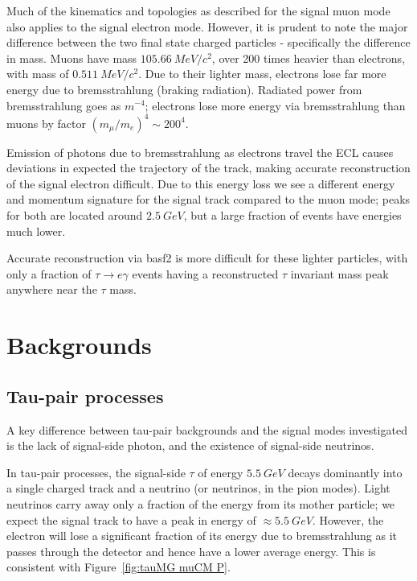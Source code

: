 \documentclass[12pt]{thesis}  %
\begin{document}
Much of the kinematics and topologies as described for the signal muon mode also applies to the signal electron mode. However, it is prudent to note the major difference between the two final state charged particles - specifically the difference in mass. Muons have mass $\SI{105.66}{MeV/c^2}$, over 200 times heavier than electrons, with mass of $\SI{0.511}{MeV/c^2}$. Due to their lighter mass, electrons lose far more energy due to bremsstrahlung (braking radiation). Radiated power from bremsstrahlung goes as $m^{-4}$; electrons lose more energy via bremsstrahlung than muons by factor $\left(m_{\mu}/m_{e}\right)^{4} \sim 200^4$.

Emission of photons due to bremsstrahlung as electrons travel the ECL causes deviations in expected the trajectory of the track, making accurate reconstruction of the signal electron difficult. Due to this energy loss we see a different energy and momentum signature for the signal track compared to the muon mode; peaks for both are located around $\SI{2.5}{GeV}$, but a large fraction of events have energies much lower.

Accurate reconstruction via basf2 is more difficult for these lighter particles, with only a fraction of $\tau\to e\gamma$ events having a reconstructed $\tau$ invariant mass peak anywhere near the $\tau$ mass.


\section{Backgrounds}

\subsection{Tau-pair processes}

A key difference between tau-pair backgrounds and the signal modes investigated is the lack of signal-side photon, and the existence of signal-side neutrinos.

In tau-pair processes, the signal-side $\tau$ of energy $\SI{5.5}{GeV}$ decays dominantly into a single charged track and a neutrino (or neutrinos, in the pion modes). Light neutrinos carry away only a fraction of the energy from its mother particle; we expect the signal track to have a peak in energy of $\approx\SI{5.5}{GeV}$. However, the electron will lose a significant fraction of its energy due to bremsstrahlung as it passes through the detector and hence have a lower average energy. This is consistent with Figure~\ref{fig:tauMG muCM P}.
\end{document}

